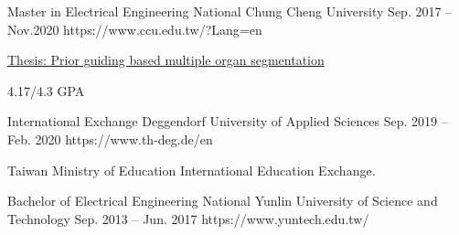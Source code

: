 

\begin{cventries}

\vspace{-0.5cm}
\cventryedu
{Master in Electrical Engineering} %
{National Chung Cheng University} %
{Sep. 2017 – Nov.2020} %
{https://www.ccu.edu.tw/?Lang=en}
{
  \begin{cvitems}
    \item \href{https://github.com/linleon1995/prior_guiding_network}{Thesis: Prior guiding based multiple organ segmentation}
    \item 4.17/4.3 GPA
  \end{cvitems}
}

\cventryedu
{International Exchange}
{Deggendorf University of Applied Sciences} %
{Sep. 2019 – Feb. 2020} %
{https://www.th-deg.de/en}
{
  \begin{cvitems}
    \item Taiwan Ministry of Education International Education Exchange.
  \end{cvitems}
}

\cventryedu
{Bachelor of Electrical Engineering} %
{National Yunlin University of Science and Technology} %
{Sep. 2013 – Jun. 2017} %
{https://www.yuntech.edu.tw/}
{}

\end{cventries}
